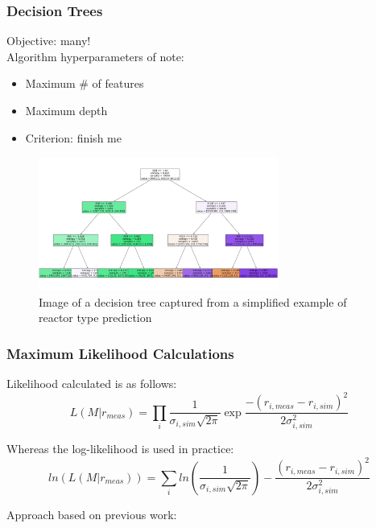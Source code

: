 \begin{frame}
  \frametitle{Decision Trees}
  Objective: many! \\%
  Algorithm hyperparameters of note:
  \begin{itemize}
    \item Maximum \# of features
    \item Maximum depth
    \item Criterion: finish me
  \end{itemize}
  \begin{figure}[h!]
    \centering
    \includegraphics[width=0.7\textwidth]{./figures/dtree.png}
    \caption{Image of a decision tree captured from a simplified example of reactor type prediction}
  \end{figure}
\end{frame}

\begin{frame}
  \frametitle{Maximum Likelihood Calculations}

Likelihood calculated is as follows:
\[L(M|r_{meas}) = \prod_i \frac{1}{\sigma_{i,sim} \sqrt{2\pi}} \exp{\frac{-(r_{i,meas} - r_{i,sim})^2}{2 \sigma_{i,sim}^2}}\]

Whereas the log-likelihood is used in practice:
\[ln(L(M|r_{meas})) = \sum_i ln(\frac{1}{\sigma_{i,sim} \sqrt{2\pi}}) - \frac{(r_{i,meas} - r_{i,sim})^2}{2 \sigma_{i,sim}^2}\]

Approach based on previous work: \cite{mll_method, mll_sensitivity} \\~\\

\end{frame}
